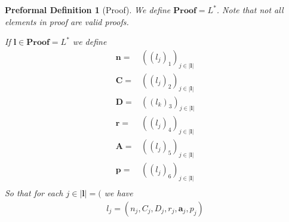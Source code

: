 \documentclass[oneside, 12pt]{book}
\theoremstyle{break}
\newtheorem{preformal definition}[definition]{Preformal Definition}
\newtheorem{preformal theorem}[theorem]{Preformal Theorem}
\newcommand{\bv}[1]{\boldsymbol{#1}}
\newcommand{\norm}[1]{\left|#1\right|}
\begin{document}
		\begin{preformal definition}[Proof]
			We define $\textbf{Proof} = L^*$.
			Note that not all elements in proof are valid proofs.
			
			If $\bv{l} \in \textbf{Proof} = L^*$ we define
			\begin{align*}
				\bv{n} =& ((l_j)_1)_{j \in \norm{\bv{l}}}\\
				\bv{C} =& ((l_j)_2)_{j \in \norm{\bv{l}}}\\
				\bv{D} =& ((l_k)_3)_{j \in \norm{\bv{l}}}\\
				\bv{r} =& ((l_j)_4)_{j \in \norm{\bv{l}}}\\
				\bv{A} =& ((l_j)_5)_{j \in \norm{\bv{l}}}\\	
				\bv{p} =& ((l_j)_6)_{j \in \norm{\bv{l}}}\\																			
			\end{align*}
			So that for each $j \in \norm{\bv{l}} = ($ we have
			\begin{align*}
				l_j = (n_j, C_j, D_j, r_j, \bv{a}_j, p_j)
			\end{align*}
		\end{preformal definition}
		
			
	
\end{document}
